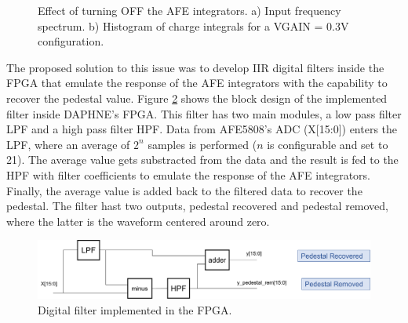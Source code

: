 \begin{figure}[h]
\centering
{}
\caption[]{Effect of turning OFF the AFE integrators.  a) Input frequency spectrum. b) Histogram of charge integrals for a VGAIN = 0.3V configuration.}
\label{fig:fbk_noise_1f}
\end{figure}

The proposed solution to this issue was to develop IIR digital filters inside the FPGA that emulate the response of the AFE integrators with the capability to recover the pedestal value. Figure \ref{fig:dig} shows the block design of the implemented filter inside DAPHNE's FPGA. This filter has two main modules, a low pass filter LPF and a high pass filter HPF. Data from AFE5808's ADC (X[15:0]) enters the LPF, where an average of $2^n$ samples is performed ($n$ is configurable and set to 21). The average value gets substracted from the data and the result is fed to the HPF with filter coefficients to emulate the response of the AFE integrators. Finally, the average value is added back to the filtered data to recover the pedestal. The filter hast two outputs, pedestal recovered and pedestal removed, where the latter is the waveform centered around zero.   

\begin{figure}[h]
\centering
\includegraphics[width=120mm]{Images/digital_filter_1.png}
\caption[]{Digital filter implemented in the FPGA.}
\label{fig:dig}
\end{figure}

